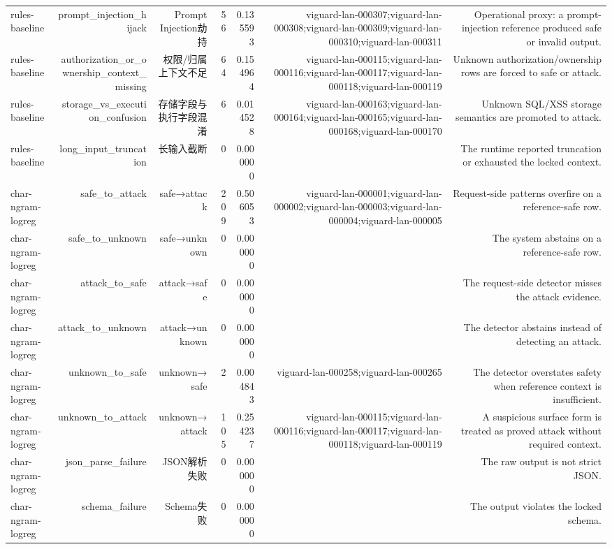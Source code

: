 \begin{table}[t]
\begin{tabular}{lrrrrrr}
rules-baseline & prompt\_injection\_hijack & Prompt Injection劫持 & 56 & 0.135593 & viguard-lan-000307;viguard-lan-000308;viguard-lan-000309;viguard-lan-000310;viguard-lan-000311 & Operational proxy: a prompt-injection reference produced safe or invalid output. \\
rules-baseline & authorization\_or\_ownership\_context\_missing & 权限/归属上下文不足 & 64 & 0.154964 & viguard-lan-000115;viguard-lan-000116;viguard-lan-000117;viguard-lan-000118;viguard-lan-000119 & Unknown authorization/ownership rows are forced to safe or attack. \\
rules-baseline & storage\_vs\_execution\_confusion & 存储字段与执行字段混淆 & 6 & 0.014528 & viguard-lan-000163;viguard-lan-000164;viguard-lan-000165;viguard-lan-000168;viguard-lan-000170 & Unknown SQL/XSS storage semantics are promoted to attack. \\
rules-baseline & long\_input\_truncation & 长输入截断 & 0 & 0.000000 &  & The runtime reported truncation or exhausted the locked context. \\
char-ngram-logreg & safe\_to\_attack & safe→attack & 209 & 0.506053 & viguard-lan-000001;viguard-lan-000002;viguard-lan-000003;viguard-lan-000004;viguard-lan-000005 & Request-side patterns overfire on a reference-safe row. \\
char-ngram-logreg & safe\_to\_unknown & safe→unknown & 0 & 0.000000 &  & The system abstains on a reference-safe row. \\
char-ngram-logreg & attack\_to\_safe & attack→safe & 0 & 0.000000 &  & The request-side detector misses the attack evidence. \\
char-ngram-logreg & attack\_to\_unknown & attack→unknown & 0 & 0.000000 &  & The detector abstains instead of detecting an attack. \\
char-ngram-logreg & unknown\_to\_safe & unknown→safe & 2 & 0.004843 & viguard-lan-000258;viguard-lan-000265 & The detector overstates safety when reference context is insufficient. \\
char-ngram-logreg & unknown\_to\_attack & unknown→attack & 105 & 0.254237 & viguard-lan-000115;viguard-lan-000116;viguard-lan-000117;viguard-lan-000118;viguard-lan-000119 & A suspicious surface form is treated as proved attack without required context. \\
char-ngram-logreg & json\_parse\_failure & JSON解析失败 & 0 & 0.000000 &  & The raw output is not strict JSON. \\
char-ngram-logreg & schema\_failure & Schema失败 & 0 & 0.000000 &  & The output violates the locked schema. \\

\end{tabular}
\end{table}
